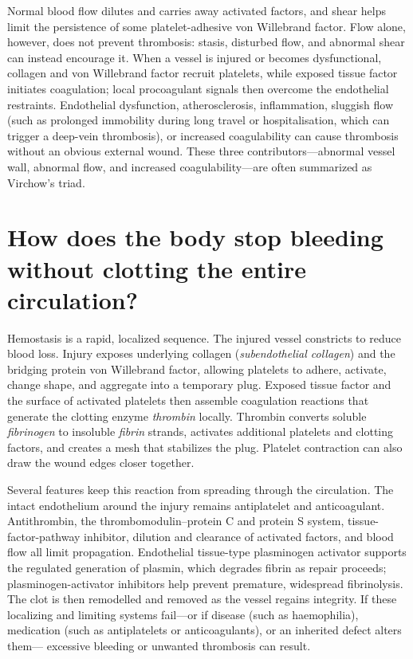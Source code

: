 \documentclass[11pt,oneside]{report}
\begin{document}
Normal blood flow dilutes and carries away activated factors, and shear helps
limit the persistence of some platelet-adhesive von Willebrand factor. Flow
alone, however, does not prevent thrombosis: stasis, disturbed flow, and
abnormal shear can instead encourage it. When a vessel is injured or becomes
dysfunctional, collagen and von Willebrand factor recruit platelets, while
exposed tissue factor initiates coagulation; local procoagulant signals then
overcome the endothelial restraints. Endothelial dysfunction, atherosclerosis,
inflammation, sluggish flow (such as prolonged immobility during long travel or
hospitalisation, which can trigger a deep-vein thrombosis), or increased
coagulability can cause thrombosis without an obvious external wound. These three contributors---abnormal vessel wall,
abnormal flow, and increased coagulability---are often summarized as
Virchow's triad.

\section{How does the body stop bleeding without clotting the entire circulation?}

Hemostasis is a rapid, localized sequence. The injured vessel constricts to
reduce blood loss. Injury exposes underlying collagen (\emph{subendothelial collagen}) and the
bridging protein von Willebrand factor, allowing platelets to adhere, activate,
change shape, and aggregate into a temporary plug. Exposed tissue factor and
the surface of activated platelets then assemble coagulation reactions that
generate the clotting enzyme \emph{thrombin} locally. Thrombin converts soluble
\emph{fibrinogen} to insoluble \emph{fibrin} strands, activates additional
platelets and clotting factors, and creates a mesh that stabilizes the plug.
Platelet contraction can also draw the wound edges closer together.

Several features keep this reaction from spreading through the circulation.
The intact endothelium around the injury remains antiplatelet and
anticoagulant. Antithrombin, the thrombomodulin--protein C and protein S
system, tissue-factor-pathway inhibitor, dilution and clearance of activated
factors, and blood flow all limit propagation. Endothelial tissue-type
plasminogen activator supports the regulated generation of plasmin, which
degrades fibrin as repair proceeds; plasminogen-activator inhibitors help
prevent premature, widespread fibrinolysis. The clot is then remodelled and
removed as the vessel regains integrity. If these localizing and limiting
systems fail---or if disease (such as haemophilia), medication (such as
antiplatelets or anticoagulants), or an inherited defect alters them---
excessive bleeding or unwanted thrombosis can result.
\end{document}
